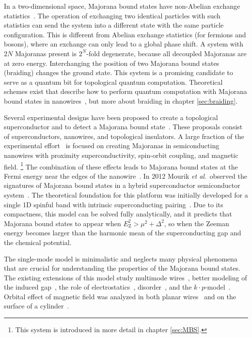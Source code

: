 In a two-dimensional space, Majorana bound states have non-Abelian exchange statistics~\cite{Stern2010}.
The operation of exchanging two identical particles with such statistics can send the system into a different state with the same particle configuration.
This is different from Abelian exchange statistics (for fermions and bosons), where an exchange can only lead to a global phase shift.
A system with $2N$ Majoranas present is $2^{N}$-fold degenerate, because all decoupled Majoranas are at zero energy.
Interchanging the position of two Majorana bound states (braiding) changes the ground state.
This system is a promising candidate to serve as a quantum bit for topological quantum computation.
Theoretical schemes exist that describe how to perform quantum computation with Majorana bound states in nanowires~\cite{Hyart2013,Alicea2011}, but more about braiding in chapter \ref{sec:braiding}.

Several experimental designs have been proposed to create a topological superconductor and to detect a Majorana bound state~\cite{Kitaev2001,Leijnse2012,Beenakker2013,Alicea2012}.
These proposals consist of superconductors, nanowires, and topological insulators.
A large fraction of the experimental effort~\cite{Mourik2012,Das2012,Deng2012,Churchill2013,Deng2014} is focused on creating Majoranas in semiconducting nanowires with proximity superconductivity, spin-orbit coupling, and magnetic field.
\footnote{This system is introduced in more detail in chapter \ref{sec:MBS}.}
The combination of these effects leads to Majorana bound states at the Fermi energy near the edges of the nanowire~\cite{Oreg2010,Lutchyn2010}.
In 2012 Mourik\textit{ et al}.~observed the signatures of Majorana bound states in a hybrid superconductor semiconductor system~\cite{Mourik2012}.
The theoretical foundation for this platform was initially developed for a single 1D spinful band with intrinsic superconducting pairing~\cite{Lutchyn2010,Oreg2010}.
Due to its compactness, this model can be solved fully analytically, and it predicts that Majorana bound states to appear when $E_{\textrm{Z}}^{2}>\mu^{2}+\Delta^{2}$, so when the Zeeman energy becomes larger than the harmonic mean of the superconducting gap and the chemical potential.

The single-mode model is minimalistic and neglects many physical phenomena that are crucial for understanding the properties of the Majorana bound states.
The existing extensions of this model study multimode wires~\cite{Potter2010a}, better modeling of the induced gap~\cite{Liu2012,Stanescu2014}, the role of electrostatics~\cite{Vuik2016}, disorder~\cite{Potter2012,Pientka2012,Adagideli2014}, and the $k\cdot p$-model~\cite{Stanescu2013a}.
Orbital effect of magnetic field was analyzed in both planar wires~\cite{Osca2015a,Lim2012} and on the surface of a cylinder~\cite{SooLim2013}.

